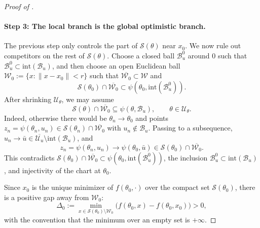 \documentclass{article}
\theoremstyle{normaltheorem}
\newcommand{\calS}{\mathcal{S}}
\begin{document}
\begin{proof}[Proof of ]
\paragraph{Step 3: The local branch is the global optimistic branch.}
The previous step only controls the part of \(\calS(\theta)\) near \(x_0\). We now rule out competitors on the rest of
\(\calS(\theta)\). Choose a closed ball \(\mathcal B_u^0\) around \(0\) such that
\(\mathcal B_u^0\subset\mathrm{int}(\mathcal B_u)\), and then choose an open Euclidean ball
\(\mathcal W_0:=\{x:\|x-x_0\|<r\}\) such that \(\overline{\mathcal W_0}\subset\mathcal W\) and
\[
\calS(\theta_0)\cap\overline{\mathcal W_0}
\subset \psi(\theta_0,\mathrm{int}(\mathcal B_u^0)).
\]
After shrinking \(\mathcal U_\theta\), we may assume
\[
\calS(\theta)\cap\overline{\mathcal W_0}\subseteq \psi(\theta,\mathcal B_u),
\qquad \theta\in\mathcal U_\theta .
\]
Indeed, otherwise there would be \(\theta_n\to\theta_0\) and points
\(z_n=\psi(\theta_n,u_n)\in\calS(\theta_n)\cap\overline{\mathcal W_0}\) with \(u_n\notin\mathcal B_u\). Passing to a
subsequence, \(u_n\to\bar u\in\overline{\mathcal U_u}\setminus\mathrm{int}(\mathcal B_u)\), and
\[
z_n=\psi(\theta_n,u_n)\to\psi(\theta_0,\bar u)\in\calS(\theta_0)\cap\overline{\mathcal W_0}.
\]
This contradicts
\(\calS(\theta_0)\cap\overline{\mathcal W_0}\subset\psi(\theta_0,\mathrm{int}(\mathcal B_u^0))\), the inclusion
\(\mathcal B_u^0\subset\mathrm{int}(\mathcal B_u)\), and injectivity of the chart at \(\theta_0\).

Since \(x_0\) is the unique minimizer of \(f(\theta_0,\cdot)\) over the compact set \(\calS(\theta_0)\), there is a
positive gap away from \(\mathcal W_0\):
\[
\Delta_0:=
\min_{x\in\calS(\theta_0)\setminus\mathcal W_0}
\big(f(\theta_0,x)-f(\theta_0,x_0)\big)>0,
\]
with the convention that the minimum over an empty set is \(+\infty\).


\end{proof}
\end{document}

